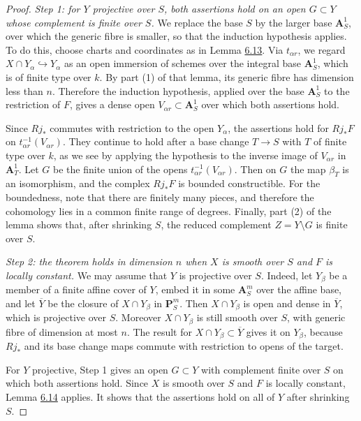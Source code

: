 \documentclass[11pt]{article}
\begin{document}
\begin{proof}[{Proof}]
\emph{Step 1: for \(Y\) projective over \(S\), both assertions hold on an open \(G\subset Y\) whose complement is finite over \(S\).} We replace the base \(S\) by the larger base \(\mathbf A^1_S\), over which the generic fibre is smaller, so that the induction hypothesis applies. To do this, choose charts and coordinates as in Lemma \hyperref[bp41]{6.13}. Via \(t_{\alpha r}\), we regard \(X\cap Y_\alpha\hookrightarrow Y_\alpha\) as an open immersion of schemes over the integral base \(\mathbf A^1_S\), which is of finite type over \(k\). By part (1) of that lemma, its generic fibre has dimension less than \(n\). Therefore the induction hypothesis, applied over the base \(\mathbf A^1_S\) to the restriction of \(F\), gives a dense open \(V_{\alpha r}\subset\mathbf A^1_S\) over which both assertions hold.

Since \(Rj_*\) commutes with restriction to the open \(Y_\alpha\), the assertions hold for \(Rj_*F\) on \(t_{\alpha r}^{-1}(V_{\alpha r})\). They continue to hold after a base change \(T\to S\) with \(T\) of finite type over \(k\), as we see by applying the hypothesis to the inverse image of \(V_{\alpha r}\) in \(\mathbf A^1_T\). Let \(G\) be the finite union of the opens \(t_{\alpha r}^{-1}(V_{\alpha r})\). Then on \(G\) the map \(\beta_T\) is an isomorphism, and the complex \(Rj_*F\) is bounded constructible. For the boundedness, note that there are finitely many pieces, and therefore the cohomology lies in a common finite range of degrees. Finally, part (2) of the lemma shows that, after shrinking \(S\), the reduced complement \(Z=Y\setminus G\) is finite over \(S\).

\emph{Step 2: the theorem holds in dimension \(n\) when \(X\) is smooth over \(S\) and \(F\) is locally constant.} We may assume that \(Y\) is projective over \(S\). Indeed, let \(Y_\beta\) be a member of a finite affine cover of \(Y\), embed it in some \(\mathbf A^m_S\) over the affine base, and let \(\overline Y\) be the closure of \(X\cap Y_\beta\) in \(\mathbf P^m_S\). Then \(X\cap Y_\beta\) is open and dense in \(\overline Y\), which is projective over \(S\). Moreover \(X\cap Y_\beta\) is still smooth over \(S\), with generic fibre of dimension at most \(n\). The result for \(X\cap Y_\beta\subset\overline Y\) gives it on \(Y_\beta\), because \(Rj_*\) and its base change maps commute with restriction to opens of the target.

For \(Y\) projective, Step 1 gives an open \(G\subset Y\) with complement finite over \(S\) on which both assertions hold. Since \(X\) is smooth over \(S\) and \(F\) is locally constant, Lemma \hyperref[bp45]{6.14} applies. It shows that the assertions hold on all of \(Y\) after shrinking \(S\).


\end{proof}
\end{document}

